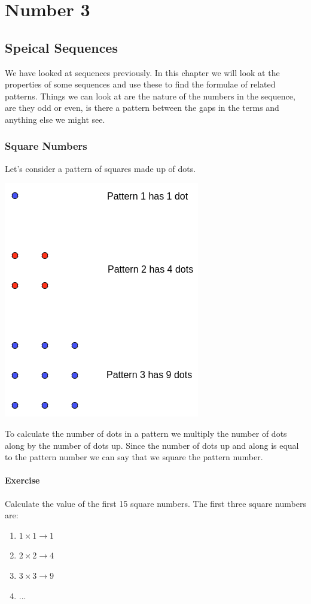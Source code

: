 \chapter{Number 3}
\section{Speical Sequences}
We have looked at sequences previously.  In this chapter we will look at the properties of some sequences and use these to find the formulae of related patterns.  Things we can look at are the nature of the numbers in the sequence, are they odd or even, is there a pattern between the gaps in the terms and anything else we might see.
\subsection{Square Numbers}
Let's consider a pattern of squares made up of dots.

\bigskip
  \begin{center}
    \includegraphics[scale=0.5]{./Images/Sequences/Seq_1.png}
  \end{center}
\bigskip

To calculate the number of dots in a pattern we multiply the number of dots along by the number of dots up.  Since the number of dots up and along is equal to the pattern number we can say that we square the pattern number.

\subsubsection{Exercise}
Calculate the value of the first 15 square numbers.  The first three square numbers are:
\begin{enumerate}
  \item $1 \times 1 \rightarrow 1$
  \item $2 \times 2 \rightarrow 4$
  \item $3 \times 3 \rightarrow 9$
  \item ...
\end{enumerate}

